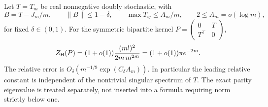 \begin{theorem}
\label{thm:relativebipartite}
Let \(T=T_m\) be real nonnegative doubly stochastic, with
\[
 B=T-J_m/m,\qquad \|B\|\leq1-\delta,\qquad
 \max T_{ij}\leq A_m/m,\qquad 2\leq A_m=o(\log m),
\]
for fixed \(\delta\in(0,1)\).
For the symmetric bipartite kernel
\(P=\begin{pmatrix}0&T\\T^\top&0\end{pmatrix}\),
\[
 Z_{\rm H}(P)
 =(1+o(1))\frac{(m!)^2}{2m\,m^{2m}}
 =(1+o(1))\pi e^{-2m}.
\]
The relative error is
\(O_\delta(m^{-1/9}\exp(C_\delta A_m))\).
In particular the leading relative constant is independent
of the nontrivial singular spectrum of \(T\).
The exact parity eigenvalue is treated separately, not inserted
into a formula requiring norm strictly below one.
\end{theorem}
